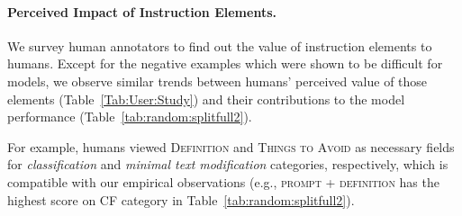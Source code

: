 \smallskip

\smallskip

\smallskip

\smallskip

\smallskip

\smallskip

\paragraph{Perceived Impact of Instruction Elements.} We survey human  annotators to find out the value of instruction elements to humans. Except for the negative examples which were shown to be difficult for models, we observe similar trends between  humans' perceived value of those elements (Table~\ref{Tab:User:Study}) and their contributions to the model performance (Table~\ref{tab:random:splitfull2}).  

For example, humans viewed  \textsc{Definition} and \textsc{Things to Avoid} as necessary fields for  \emph{classification}  and \emph{minimal text modification} categories, respectively, which is compatible with our empirical observations (e.g., \textsc{prompt + definition} has the highest score on CF category in Table~\ref{tab:random:splitfull2}). 

